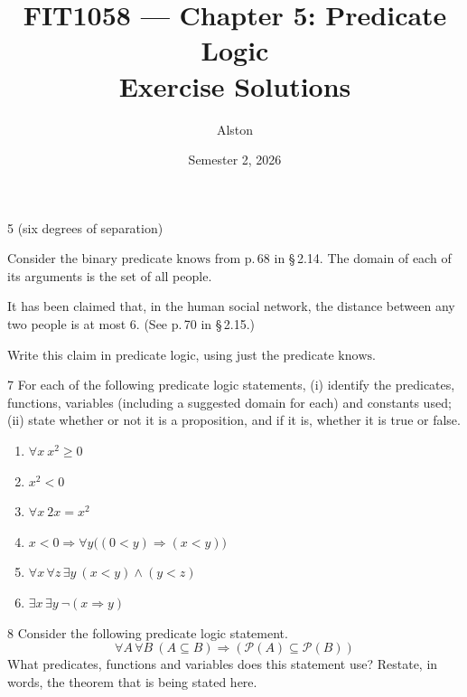 \documentclass[11pt]{article}
\title{FIT1058 --- Chapter 5: Predicate Logic\\ \large Exercise Solutions}
\author{Alston}
\date{Semester 2, 2026}
\begin{document}
\maketitle


\begin{exercise}{5}
    (six degrees of separation)

    Consider the binary predicate $\text{knows}$ from p.\,68 in
    \S\,2.14. The domain of each of its arguments is the set of all
    people.

    It has been claimed that, in the human social network, the
    distance between any two people is at most 6. (See p.\,70 in
    \S\,2.15.)

    Write this claim in predicate logic, using just the predicate
    $\text{knows}$.
\end{exercise}

\begin{exercise}{7}
    For each of the following predicate logic statements, (i) identify
    the predicates, functions, variables (including a suggested domain
    for each) and constants used; (ii) state whether or not it is a
    proposition, and if it is, whether it is true or false.
    \begin{enumerate}[label=(\alph*)]
        \item $\forall x\ x^2\geq 0$
        \item $x^2<0$
        \item $\forall x\ 2x=x^2$
        \item $x<0 \Rightarrow \forall y\big((0<y)\Rightarrow(x<y)\big)$
        \item $\forall x\,\forall z\,\exists y\ (x<y)\wedge(y<z)$
        \item $\exists x\,\exists y\ \neg(x\Rightarrow y)$
    \end{enumerate}
\end{exercise}

\begin{exercise}{8}
    Consider the following predicate logic statement.
    \[
    \forall A\,\forall B\ (A\subseteq B)\Rightarrow(\mathcal{P}(A)\subseteq\mathcal{P}(B))
    \]
    What predicates, functions and variables does this statement use?
    Restate, in words, the theorem that is being stated here.
\end{exercise}
\end{document}
